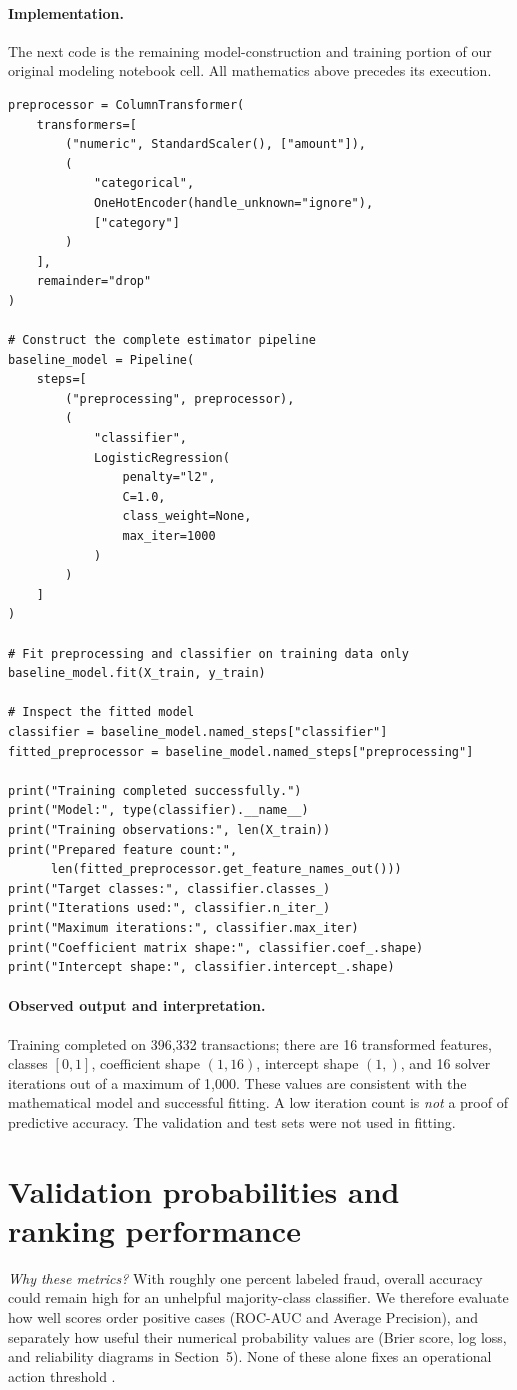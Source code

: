 \documentclass[11pt,a4paper]{article}
\begin{document}
\paragraph{Implementation.} The next code is the remaining model-construction and training portion of our original modeling notebook cell. All mathematics above precedes its execution.
\begin{lstlisting}
preprocessor = ColumnTransformer(
    transformers=[
        ("numeric", StandardScaler(), ["amount"]),
        (
            "categorical",
            OneHotEncoder(handle_unknown="ignore"),
            ["category"]
        )
    ],
    remainder="drop"
)

# Construct the complete estimator pipeline
baseline_model = Pipeline(
    steps=[
        ("preprocessing", preprocessor),
        (
            "classifier",
            LogisticRegression(
                penalty="l2",
                C=1.0,
                class_weight=None,
                max_iter=1000
            )
        )
    ]
)

# Fit preprocessing and classifier on training data only
baseline_model.fit(X_train, y_train)

# Inspect the fitted model
classifier = baseline_model.named_steps["classifier"]
fitted_preprocessor = baseline_model.named_steps["preprocessing"]

print("Training completed successfully.")
print("Model:", type(classifier).__name__)
print("Training observations:", len(X_train))
print("Prepared feature count:",
      len(fitted_preprocessor.get_feature_names_out()))
print("Target classes:", classifier.classes_)
print("Iterations used:", classifier.n_iter_)
print("Maximum iterations:", classifier.max_iter)
print("Coefficient matrix shape:", classifier.coef_.shape)
print("Intercept shape:", classifier.intercept_.shape)
\end{lstlisting}
\paragraph{Observed output and interpretation.} Training completed on 396,332 transactions; there are 16 transformed features, classes $[0,1]$, coefficient shape $(1,16)$, intercept shape $(1,)$, and 16 solver iterations out of a maximum of 1,000. These values are consistent with the mathematical model and successful fitting. A low iteration count is \emph{not} a proof of predictive accuracy. The validation and test sets were not used in fitting.

\section{Validation probabilities and ranking performance}
\noindent\textit{Why these metrics?} With roughly one percent labeled fraud,
overall accuracy could remain high for an unhelpful majority-class
classifier. We therefore evaluate how well scores order positive
cases (ROC-AUC and Average Precision), and separately how useful
their numerical probability values are (Brier score, log loss, and
reliability diagrams in Section~5). None of these alone fixes
an operational action threshold \cite{fawcett2006,saito2015,gneiting2007}.
\end{document}
